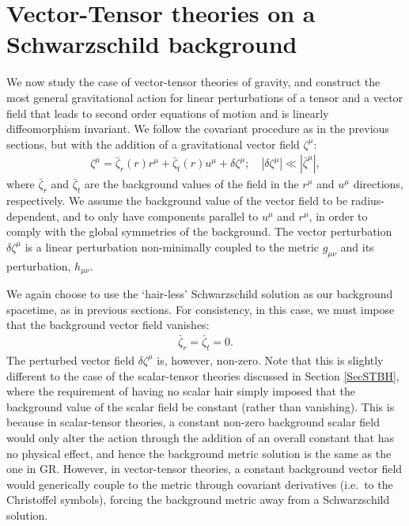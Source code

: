 \documentclass[10pt,twocolumn,preprintnumbers,amsmath,amssymb,nofootinbib
,superscriptaddress]{revtex4-1}
\begin{document}
{\allowdisplaybreaks[1]
\section{Vector-Tensor theories on a Schwarzschild background}\label{secVT}

We now study the case of vector-tensor theories of gravity, and construct the most general gravitational action for linear perturbations of a tensor and a vector field that leads to second order equations of motion and is linearly diffeomorphism invariant. We follow the covariant procedure as in the previous sections, but with the addition of a gravitational vector field $\zeta^\mu$:
\begin{align}
 \zeta^\mu=\bar{\zeta}_r(r)r^\mu+\bar{\zeta}_t(r)u^\mu+\delta\zeta^\mu; \quad |\delta\zeta^\mu|\ll |\bar{\zeta}^\mu|,
\end{align}
where $\bar{\zeta}_r$ and $\bar{\zeta}_t$ are the background values of the field in the $r^\mu$ and $u^\mu$ directions, respectively. We assume the background value of the vector field to be radius-dependent, and to only have components parallel to $u^\mu$ and $r^\mu$, in order to comply with the global symmetries of the background. The vector perturbation $\delta\zeta^\mu$ is a linear perturbation non-minimally coupled to the metric $g_{\mu\nu}$ and its perturbation, $h_{\mu\nu}$. 

We again choose to use the `hair-less' Schwarzschild solution as our background spacetime, as in previous sections. For consistency, in this case, we must impose that the background vector field vanishes:
\begin{align}
\bar{\zeta}_r=\bar{\zeta}_t=0\label{vectorbackground}.
\end{align}
The perturbed vector field $\delta\zeta^\mu$ is, however, non-zero. Note that this is slightly different to the case of the scalar-tensor theories discussed in Section \ref{SecSTBH}, where the requirement of having no scalar hair simply imposed that the background value of the scalar field be constant (rather than vanishing). This is because in scalar-tensor theories, a constant non-zero background scalar field would only alter the action through the addition of an overall constant that has no physical effect, and hence the background metric solution is the same as the one in GR. However, in vector-tensor theories, a constant background vector field would generically couple to the metric through covariant derivatives (i.e.~to the Christoffel symbols), forcing the background metric away from a Schwarzschild solution. 

}
\end{document}
